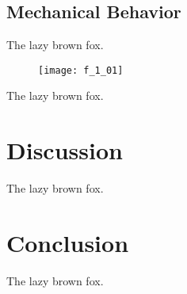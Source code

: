 \begin{refsection}
\subsection{Mechanical Behavior}

The lazy brown fox.

\begin{figure}[h!]
    \centering
    \texttt{[image: f\_1\_01]}
    \caption{}
    \label{fig:rheology}
\end{figure}

The lazy brown fox.

\section{Discussion}

The lazy brown fox.

\section{Conclusion}

The lazy brown fox.

\printbibliography[heading=subbibliography]

\end{refsection}
